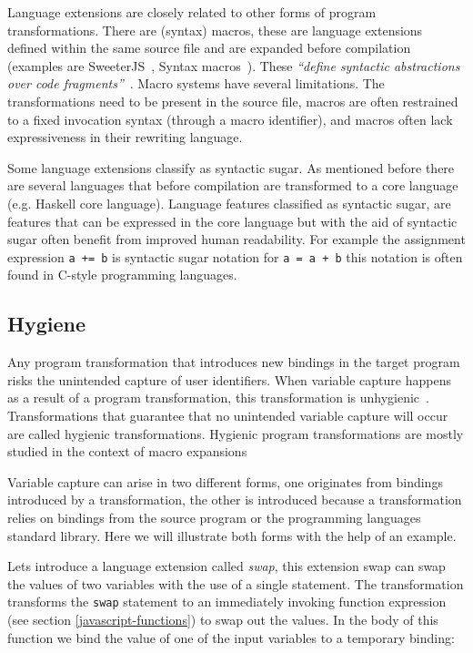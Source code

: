 Language extensions are closely related to other forms of program transformations. There are (syntax) macros\cite{Leavenworth1966}, these are language extensions defined within the same source file and are expanded before compilation (examples are SweeterJS~\cite{Disney2014}, Syntax macros~\cite{Weise1993}). These \textit{``define syntactic abstractions over code fragments''}~\cite{Bravenboer2004}. Macro systems have several limitations. The transformations need to be present in the source file, macros are often restrained to a fixed invocation syntax (through a macro identifier), and macros often lack expressiveness in their rewriting language\cite{Bravenboer2004}.

Some language extensions classify as syntactic sugar. As mentioned before there are several languages that before compilation are transformed to a core language (e.g. Haskell core language).  Language features classified as syntactic sugar, are features that can be expressed in the core language but with the aid of syntactic sugar often benefit from improved human readability. For example the assignment expression \lstinline$a += b$ is syntactic sugar notation for \lstinline$a = a + b$ this notation is often found in C-style programming languages.

\subsection{Hygiene} \label{hygiene}
Any program transformation that introduces new bindings in the target program risks the unintended capture of user identifiers. When variable capture happens as a result of a program transformation, this transformation is unhygienic~\cite{Erdweg2014}. Transformations that guarantee that no unintended variable capture will occur are called hygienic transformations. Hygienic program transformations are mostly studied in the context of macro expansions~\cite{Herman2010a,Herman2010,Disney2014}

Variable capture can arise in two different forms, one originates from bindings introduced by a transformation, the other is introduced because a transformation relies on bindings from the source program or the programming languages standard library. Here we will illustrate both forms with the help of an example.

Lets introduce a language extension called \textit{swap}, this extension swap can swap the values of two variables with the use of a single statement. The transformation transforms the \lstinline$swap$ statement to an immediately invoking function expression (see section \ref{javascript-functions}) to swap out the values. In the body of this function we bind the value of one of the input variables to a temporary binding:

